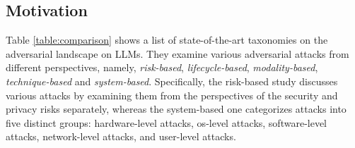 \subsection{Motivation}

Table \ref{table:comparison} shows a list of state-of-the-art taxonomies on the adversarial landscape on LLMs. They examine various adversarial attacks from different perspectives, namely, {\em risk-based}, {\em lifecycle-based}, {\em modality-based}, {\em technique-based} and {\em system-based}. Specifically, the risk-based study \cite{das2024_survey} discusses various attacks by examining them from the perspectives of the security and privacy risks separately, whereas the system-based one \cite{yao2024_survey} categorizes attacks into five distinct groups: hardware-level attacks, os-level attacks, software-level attacks, network-level attacks, and user-level attacks.

